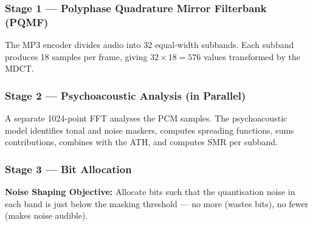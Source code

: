 \subsubsection{Stage 1 --- Polyphase Quadrature Mirror Filterbank (PQMF)}

The MP3 encoder divides audio into 32 equal-width subbands. Each subband produces 18 samples per frame, giving $32\times18=576$ values transformed by the MDCT.

\subsubsection{Stage 2 --- Psychoacoustic Analysis (in Parallel)}

A separate 1024-point FFT analyses the PCM samples. The psychoacoustic model identifies tonal and noise maskers, computes spreading functions, sums contributions, combines with the ATH, and computes SMR per subband.

\subsubsection{Stage 3 --- Bit Allocation}

\begin{definitionbox}
\textbf{Noise Shaping Objective:} Allocate bits such that the quantisation noise in each band is just below the masking threshold --- no more (wastes bits), no fewer (makes noise audible).
\end{definitionbox}

